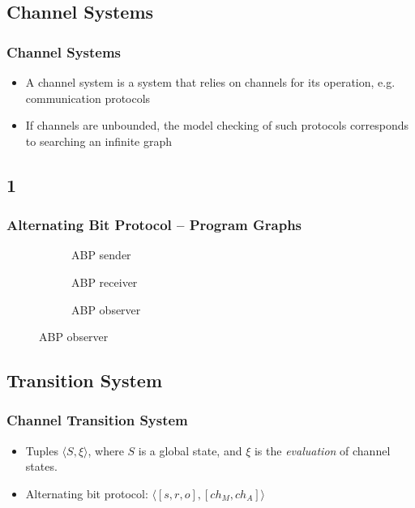 \documentclass[handout]{beamer}
\begin{document}
\subsection{Channel Systems}
\begin{frame}
  \frametitle{Channel Systems}
  \begin{itemize}
  \item
    A channel system is a system that relies on channels for its operation, e.g. communication protocols
  \item
    If channels are unbounded, the model checking of such protocols corresponds to searching an infinite graph
  \end{itemize}
\end{frame}

\subsection*{1}
\begin{frame}
  \begin{example}
    \frametitle{Alternating Bit Protocol -- Program Graphs}
    \begin{figure}
      \begin{subfigure}[b]{0.49\textwidth}
        \abpsender
        \caption{\tiny ABP sender}
      \end{subfigure}
      \begin{subfigure}[b]{0.49\textwidth}
        \abpreceiver
        \caption{\tiny ABP receiver}
      \end{subfigure}
      \begin{subfigure}[b]{\textwidth}
        \center
        \abpobserver
        \caption{\tiny ABP observer}
      \end{subfigure}
    \end{figure}
  \end{example}
\end{frame}

\subsection{Transition System}
\begin{frame}
  \frametitle{Channel Transition System}
  \begin{itemize}
  \item
    Tuples $\langle S, \xi\rangle$, where $S$ is a global state, and $\xi$ is the \emph{evaluation} of channel states.
  \item
    Alternating bit protocol: $\langle [s, r, o], [ch_M, ch_A]\rangle$
  \end{itemize}
\end{frame}
\end{document}
